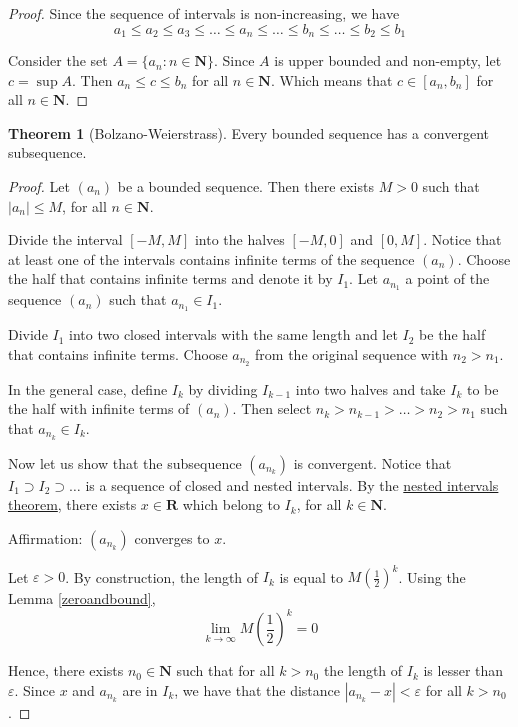 \documentclass[12pt,a4paper]{article}
\theoremstyle{definition}
\newtheorem{theorem}{Theorem}[section]
\begin{document}
\begin{proof}
	Since the sequence of intervals is non-increasing, we have
	\[
		a_1 \leq a_2 \leq a_3 \leq \ldots \leq a_n \leq \ldots \leq b_n \leq \ldots \leq b_2 \leq b_1
	\]
	
	Consider the set $A = \{ a_n : n \in \textbf{N} \}$. Since $A$ is upper bounded and non-empty, let $c = \sup A$. Then $a_n \leq c \leq b_n$ for all $n \in \textbf{N}$. Which means that $c \in [a_n, b_n]$ for all $n \in \textbf{N}$.
\end{proof}

\begin{theorem}[Bolzano-Weierstrass]\label{bolz-weier}
	Every bounded sequence has a convergent subsequence.
\end{theorem}

\begin{proof}
	Let $(a_n)$ be a bounded sequence. Then there exists $M > 0$ such that $|a_n| \leq M$, for all $n \in \textbf{N}$.
	
	Divide the interval $[-M,M]$ into the halves $[-M,0]$ and $[0,M]$. Notice that at least one of the intervals contains infinite terms of the sequence $(a_n)$. Choose the half that contains infinite terms and denote it by $I_1$. Let $a_{n_1}$ a point of the sequence $(a_n)$ such that $a_{n_1} \in I_1$.
	
	Divide $I_1$ into two closed intervals with the same length and let $I_2$ be the half that contains infinite terms. Choose $a_{n_2}$ from the original sequence with $n_2 > n_1$.
	
	In the general case, define $I_k$ by dividing $I_{k-1}$ into two halves and take $I_k$ to be the half with infinite terms of $(a_n)$. Then select $n_k > n_{k-1} > \ldots > n_2 > n_1$ such that $a_{n_k}\in I_k$. 
	
	Now let us show that the subsequence $(a_{n_k})$ is convergent. Notice that $I_1 \supset I_2 \supset \ldots$ is a sequence of closed and nested intervals. By the \hyperref[nested-intervals]{nested intervals theorem}, there exists $x \in \textbf{R}$ which belong to $I_k$, for all $k \in \textbf{N}$. 
	
	Affirmation: $(a_{n_k})$ converges to $x$. 
	
	Let $\varepsilon > 0$. By construction, the length of $I_k$ is equal to $M \left( \frac{1}{2} \right)^k$. Using the Lemma \ref{zeroandbound}, 
	\[
		\lim_{k \to \infty} M \left( \frac{1}{2} \right)^k = 0
	\]
	
	Hence, there exists $n_0 \in \textbf{N}$ such that for all $k > n_0$ the length of $I_k$ is lesser than $\varepsilon$. Since $x$ and $a_{n_k}$ are in $I_k$, we have that the distance $|a_{n_k} - x| < \varepsilon$ for all $k > n_0$.
\end{proof}
\end{document}
